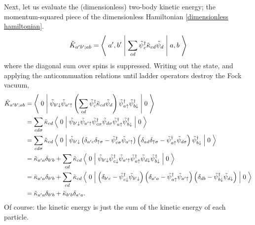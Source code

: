 Next, let us evaluate the (dimensionless) two-body kinetic energy; the momentum-squared piece of the dimensionless Hamiltonian \eqref{dimensionless hamiltonian}.
\begin{align}
    \tilde{K}_{a'b';ab} = \left\langle\;a',b'\;\middle|\;
        \sum_{cd} \tilde{\psi}{}^{\dagger}_c \tilde{\kappa}_{cd} \tilde{\psi}_d
    \;\middle|\;a,b\;\right\rangle
\end{align}
where the diagonal sum over spins is suppressed.
Writing out the state, and applying the anticommuation relations until ladder operators destroy the Fock vacuum,
\begin{align}
    \tilde{K}_{a'b';ab}
    &= \left\langle\;0\;\middle|\;
            \tilde{\psi}_{b'\downarrow} \tilde{\psi}_{a'\uparrow} 
            \left(\sum_{cd} \tilde{\psi}{}^{\dagger}_c \tilde{\kappa}_{cd} \tilde{\psi}_d\right)
            \tilde{\psi}{}^{\dagger}_{a\uparrow} \tilde{\psi}{}^{\dagger}_{b\downarrow}
        \;\middle|\;0\;\right\rangle
    \nonumber\\
    &= \sum_{cd\sigma} \tilde{\kappa}_{cd} \left\langle\;0\;\middle|\;
            \tilde{\psi}_{b'\downarrow} \tilde{\psi}_{a'\uparrow} 
            \tilde{\psi}{}^{\dagger}_{c\sigma} \tilde{\psi}_{d\sigma}
            \tilde{\psi}{}^{\dagger}_{a\uparrow} \tilde{\psi}{}^{\dagger}_{b\downarrow}
        \;\middle|\;0\;\right\rangle
    \nonumber\\
    &= \sum_{cd\sigma} \tilde{\kappa}_{cd} \left\langle\;0\;\middle|\;
            \tilde{\psi}_{b'\downarrow}
            \left(\delta_{a'c}\delta_{\uparrow\sigma} - \tilde{\psi}{}^{\dagger}_{c\sigma} \tilde{\psi}_{a'\uparrow} \right)
            \left(\delta_{ad}\delta_{\uparrow\sigma} - \tilde{\psi}{}^{\dagger}_{a\uparrow}\tilde{\psi}_{d\sigma} \right)
            \tilde{\psi}{}^{\dagger}_{b\downarrow}
        \;\middle|\;0\;\right\rangle
    \nonumber\\
    &= \tilde{\kappa}_{a'a} \delta_{b'b} + \sum_{cd} \tilde{\kappa}_{cd} \left\langle\;0\;\middle|\;
            \tilde{\psi}_{b'\downarrow}
            \tilde{\psi}{}^{\dagger}_{c\downarrow} \tilde{\psi}_{a'\uparrow}
            \tilde{\psi}{}^{\dagger}_{a\uparrow}\tilde{\psi}_{d\downarrow}
            \tilde{\psi}{}^{\dagger}_{b\downarrow}
        \;\middle|\;0\;\right\rangle
    \nonumber\\
    &= \tilde{\kappa}_{a'a} \delta_{b'b} + \sum_{cd} \tilde{\kappa}_{cd} \left\langle\;0\;\middle|\;
            \left(\delta_{b'c} - \tilde{\psi}{}^{\dagger}_{c\downarrow}\tilde{\psi}_{b'\downarrow} \right)
            \left(\delta_{a'a} - \tilde{\psi}{}^{\dagger}_{a\uparrow}\tilde{\psi}_{a'\uparrow} \right)
            \left(\delta_{db} - \tilde{\psi}{}^{\dagger}_{b\downarrow} \tilde{\psi}_{d\downarrow} \right)
        \;\middle|\;0\;\right\rangle
    \nonumber\\
    &= \tilde{\kappa}_{a'a} \delta_{b'b} + \tilde{\kappa}_{b'b} \delta_{a'a}.
\end{align}
Of course: the kinetic energy is just the sum of the kinetic energy of each particle.
